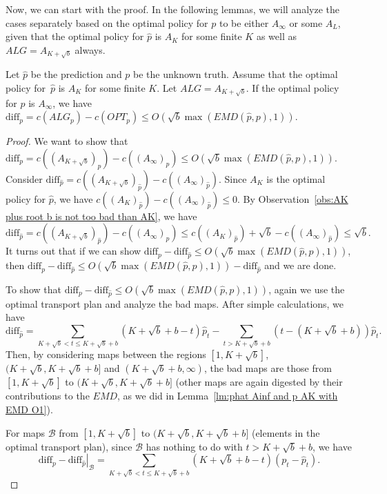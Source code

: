 Now, we can start with the proof. In the following lemmas, we will analyze the cases separately based on the optimal policy for $p$ to be either $A_\infty$ or some $A_L$, given that the optimal policy for $\hat{p}$ is $A_K$ for some finite $K$ as well as $ALG=A_{K+\sqrt{b}}$ always.


\begin{lemma}
    \label{lm:phat is AK and p is Ainf and root b loss}
    Let $\hat{p}$ be the prediction and $p$ be the unknown truth. Assume that the optimal policy for~$\hat{p}$ is $A_K$ for some finite $K$. Let $ALG = A_{K+\sqrt{b}}$. If the optimal policy for $p$ is $A_\infty$, we have $\text{diff}_p = c(ALG_p) - c(OPT_p) \leq O(\sqrt{b} \max(EMD(\hat{p},p),1))$.
\end{lemma}

\begin{proof}
    We want to show that $\text{diff}_p = c((A_{K+\sqrt{b}})_p) - c((A_\infty)_p) \leq O(\sqrt{b} \max(EMD(\hat{p},p),1))$. Consider $\text{diff}_{\hat{p}} = c((A_{K+\sqrt{b}})_{\hat{p}}) - c((A_\infty)_{\hat{p}})$. Since $A_K$ is the optimal policy for $\hat{p}$, we have $c((A_{K})_{\hat{p}}) - c((A_\infty)_{\hat{p}}) \leq 0$. By Observation~\ref{obs:AK plus root b is not too bad than AK}, we have 
    \[\text{diff}_{\hat{p}} = c((A_{K+\sqrt{b}})_{\hat{p}}) - c((A_\infty)_{\hat{p}}) \leq c((A_{K})_{\hat{p}}) + \sqrt{b}- c((A_\infty)_{\hat{p}}) \leq \sqrt{b}.\]
    It turns out that if we can show $\text{diff}_p - \text{diff}_{\hat{p}} \leq O(\sqrt{b} \max(EMD(\hat{p},p),1))$, then $\text{diff}_p - \text{diff}_{\hat{p}} \leq O(\sqrt{b} \max(EMD(\hat{p},p),1)) - \text{diff}_{\hat{p}}$ and we are done.

    To show that $\text{diff}_p - \text{diff}_{\hat{p}} \leq O(\sqrt{b} \max(EMD(\hat{p},p),1))$, again we use the optimal transport plan and analyze the bad maps. After simple calculations, we have 
    $$\text{diff}_{\hat{p}} = \sum_{K+\sqrt{b}< t \leq K+\sqrt{b}+b}(K+\sqrt{b}+b-t)\hat{p}_t - \sum_{t > K+\sqrt{b}+b}(t-(K+\sqrt{b}+b))\hat{p}_t.$$ 
    Then, by considering maps between the regions $[1,K+\sqrt{b}]$, $(K+\sqrt{b},K+\sqrt{b}+b]$ and $(K+\sqrt{b}+b,\infty)$, the bad maps are those from $[1,K+\sqrt{b}]$ to $(K+\sqrt{b},K+\sqrt{b}+b]$ (other maps are again digested by their contributions to the $EMD$, as we did in Lemma~\ref{lm:phat Ainf and p AK with EMD O1}). 

    For maps $\mathcal{B}$ from $[1,K+\sqrt{b}]$ to $(K+\sqrt{b},K+\sqrt{b}+b]$ (elements in the optimal transport plan), since $\mathcal{B}$ has nothing to do with $t>K+\sqrt{b}+b$, we have $$\left. \text{diff}_p - \text{diff}_{\hat{p}}\right|_{\mathcal{B}} = \sum_{K+\sqrt{b}<t\leq K+\sqrt{b}+b}(K+\sqrt{b}+b-t)(p_t - \hat{p}_t).$$
    

\end{proof}
